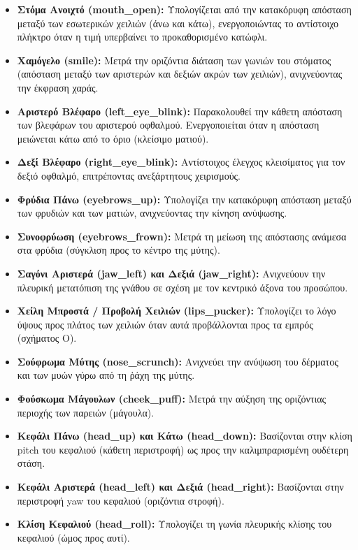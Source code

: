 \documentclass[twoside, a4paper, 11pt]{article}
\newcommand{\textlatin}[1]{\textenglish{#1}}
\begin{document}
\begin{itemize}
    \item \textbf{Στόμα Ανοιχτό (\textlatin{mouth\_open}):} Υπολογίζεται από την κατακόρυφη απόσταση μεταξύ των εσωτερικών χειλιών (άνω και κάτω), ενεργοποιώντας το αντίστοιχο πλήκτρο όταν η τιμή υπερβαίνει το προκαθορισμένο κατώφλι.
    \item \textbf{Χαμόγελο (\textlatin{smile}):} Μετρά την οριζόντια διάταση των γωνιών του στόματος (απόσταση μεταξύ των αριστερών και δεξιών ακρών των χειλιών), ανιχνεύοντας την έκφραση χαράς.
    \item \textbf{Αριστερό Βλέφαρο (\textlatin{left\_eye\_blink}):} Παρακολουθεί την κάθετη απόσταση των βλεφάρων του αριστερού οφθαλμού. Ενεργοποιείται όταν η απόσταση μειώνεται κάτω από το όριο (κλείσιμο ματιού).
    \item \textbf{Δεξί Βλέφαρο (\textlatin{right\_eye\_blink}):} Αντίστοιχος έλεγχος κλεισίματος για τον δεξιό οφθαλμό, επιτρέποντας ανεξάρτητους χειρισμούς.
    \item \textbf{Φρύδια Πάνω (\textlatin{eyebrows\_up}):} Υπολογίζει την κατακόρυφη απόσταση μεταξύ των φρυδιών και των ματιών, ανιχνεύοντας την κίνηση ανύψωσης.
    \item \textbf{Συνοφρύωση (\textlatin{eyebrows\_frown}):} Μετρά τη μείωση της απόστασης ανάμεσα στα φρύδια (σύγκλιση προς το κέντρο της μύτης).
    \item \textbf{Σαγόνι Αριστερά (\textlatin{jaw\_left}) και Δεξιά (\textlatin{jaw\_right}):} Ανιχνεύουν την πλευρική μετατόπιση της γνάθου σε σχέση με τον κεντρικό άξονα του προσώπου.
    \item \textbf{Χείλη Μπροστά / Προβολή Χειλιών (\textlatin{lips\_pucker}):} Υπολογίζει το λόγο ύψους προς πλάτος των χειλιών όταν αυτά προβάλλονται προς τα εμπρός (σχήματος \textlatin{O}).
    \item \textbf{Σούφρωμα Μύτης (\textlatin{nose\_scrunch}):} Ανιχνεύει την ανύψωση του δέρματος και των μυών γύρω από τη ῥάχη της μύτης.
    \item \textbf{Φούσκωμα Μάγουλων (\textlatin{cheek\_puff}):} Μετρά την αύξηση της οριζόντιας περιοχής των παρειών (μάγουλα).
    \item \textbf{Κεφάλι Πάνω (\textlatin{head\_up}) και Κάτω (\textlatin{head\_down}):} Βασίζονται στην κλίση \textlatin{pitch} του κεφαλιού (κάθετη περιστροφή) ως προς την καλιμπραρισμένη ουδέτερη στάση.
    \item \textbf{Κεφάλι Αριστερά (\textlatin{head\_left}) και Δεξιά (\textlatin{head\_right}):} Βασίζονται στην περιστροφή \textlatin{yaw} του κεφαλιού (οριζόντια στροφή).
    \item \textbf{Κλίση Κεφαλιού (\textlatin{head\_roll}):} Υπολογίζει τη γωνία πλευρικής κλίσης του κεφαλιού (ώμος προς αυτί).
\end{itemize}
\end{document}
